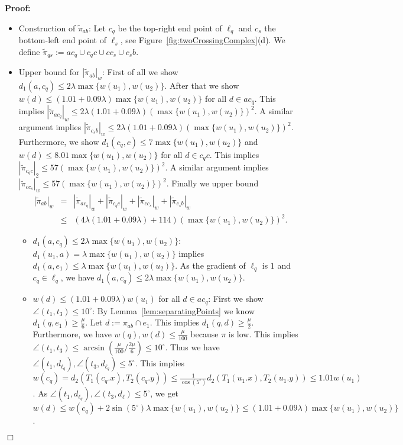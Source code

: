 \documentclass[a4paper,11pt]{article}
\newenvironment{proof}{\textbf{Proof:}}{\hspace*{0mm}\hfill\ensuremath{\Box}}
\begin{document}
\begin{proof}
	\begin{itemize} 
		\item Construction of $\widetilde{\pi}_{ab}$: Let $c_q$ be the top-right end point of $\ell_q$ and $c_s$ the bottom-left end point of $\ell_s$, see Figure~\ref{fig:twoCrossingComplex}(d). We define $\widetilde{\pi}_{qs} := ac_q \cup c_qc \cup cc_s \cup c_sb$. 
		\item Upper bound for $|\widetilde{\pi}_{ab}|_w$: First of all we show $d_1(a,c_q) \leq 2 \lambda \max \{w(u_1),w(u_2) \}$. After that we show $w(d) \leq (1.01 + 0.09 \lambda) \max \{ w(u_1), w(u_2) \}$ for all $d \in a c_q$. This implies $|\widetilde{\pi}_{ac_q}|_w \leq 2 \lambda (1.01 + 0.09 \lambda) (\max \{w (u_1),w(u_2) \})^2$. A similar argument implies $|\widetilde{\pi}_{c_sb}|_w \leq 2 \lambda (1.01 + 0.09 \lambda) (\max \{ w(u_1),w (u_2) \})^2$. Furthermore, we show $d_1(c_q, c) \leq 7 \max \{ w(u_1),w (u_2) \}$ and $w(d) \leq 8.01 \max \{ w(u_1), w(u_2)\}$ for all $d \in c_q c$. This implies $|\widetilde{\pi}_{c_qc}|_2 \leq 57 (\max \{w(u_1),w(u_2)\})^2$. A similar argument implies  $|\widetilde{\pi}_{cc_s}|_w \leq 57 (\max \{ w(u_1),w(u_2) \})^2$. Finally we upper bound
			\begin{eqnarray*}
				|\widetilde{\pi}_{ab}|_ w & = & |\widetilde{\pi}_{ac_q}|_ w + |\widetilde{\pi}_{c_qc}|_ w + |\widetilde{\pi}_{cc_s}|_ w + |\widetilde{\pi}_{c_sb}|_ w\\
				&\leq& ( 4 \lambda (1.01 + 0.09 \lambda) + 114) (\max \{ w(u_1), w(u_2)\})^2.
			\end{eqnarray*} 
			\begin{itemize}
				\item $d_1(a,c_q) \leq 2 \lambda \max \{w(u_1),w(u_2) \}$: $d_1(u_1,a) = \lambda \max \{ w(u_1),w(u_2) \}$ implies $d_1(a,e_1) \leq \lambda \max \{ w(u_1),w(u_2) \}$. As the gradient of $\ell_q$ is $1$ and $c_q \in \ell_q$, we have $d_1(a,c_q) \leq 2 \lambda \max \{ w(u_1), w(u_2) \}$.
				\item $w(d) \leq (1.01 + 0.09 \lambda) w(u_1)$ for all $d \in a c_q$: First we show $\angle (t_1,t_3) \leq 10^{\circ}$: By Lemma~\ref{lem:separatingPoints} we know $d_1(q,e_1) \geq \frac{\mu}{6}$. Let $d := \pi_{ab} \cap e_1$. This implies $d_1(q,d)\geq \frac{\mu}{2}$. Furthermore, we have $w(q),w(d) \leq \frac{\mu}{100}$ because $\pi$ is low. This implies $\angle (t_1,t_3) \leq \arcsin (\frac{\mu}{100}/\frac{2 \mu}{6}) \leq 10^{\circ}$. Thus we have $\angle (t_1,d_{\ell_q}), \angle (t_3,d_{\ell_q}) \leq 5^{\circ}$. This implies $w(c_q) = d_2(T_1(c_q.x), T_2(c_q.y)) \leq \frac{1}{\cos (5^{\circ})} d_2(T_1(u_1.x), T_2(u_1.y)) \leq 1.01 w(u_1)$. As $\angle (t_1, d_{\ell_q}), \angle (t_3,d_{\ell}) \leq 5^{\circ}$, we get $w(d) \leq w(c_q) + 2 \sin (5^{\circ}) \lambda \max \{ w(u_1), w(u_2) \} \leq (1.01 + 0.09 \lambda) \max \{ w(u_1), w(u_2) \}$.

\end{itemize}
\end{itemize}
\end{proof}
\end{document}
